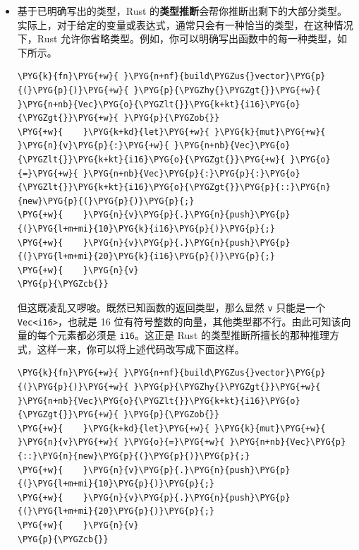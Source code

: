\begin{itemize}
\item 基于已明确写出的类型，Rust 的\textbf{类型推断}会帮你推断出剩下的大部分类型。实际上，对于给定的变量或表达式，通常只会有一种恰当的类型，在这种情况下，Rust 允许你省略类型。例如，你可以明确写出函数中的每一种类型，如下所示。

\begin{Verbatim}[commandchars=\\\{\},breaklines=true,breakanywhere=true,fontsize=\codefont,xleftmargin=17bp]
\PYG{k}{fn}\PYG{+w}{ }\PYG{n+nf}{build\PYGZus{}vector}\PYG{p}{(}\PYG{p}{)}\PYG{+w}{ }\PYG{p}{\PYGZhy{}\PYGZgt{}}\PYG{+w}{ }\PYG{n+nb}{Vec}\PYG{o}{\PYGZlt{}}\PYG{k+kt}{i16}\PYG{o}{\PYGZgt{}}\PYG{+w}{ }\PYG{p}{\PYGZob{}}
\PYG{+w}{    }\PYG{k+kd}{let}\PYG{+w}{ }\PYG{k}{mut}\PYG{+w}{ }\PYG{n}{v}\PYG{p}{:}\PYG{+w}{ }\PYG{n+nb}{Vec}\PYG{o}{\PYGZlt{}}\PYG{k+kt}{i16}\PYG{o}{\PYGZgt{}}\PYG{+w}{ }\PYG{o}{=}\PYG{+w}{ }\PYG{n+nb}{Vec}\PYG{p}{:}\PYG{p}{:}\PYG{o}{\PYGZlt{}}\PYG{k+kt}{i16}\PYG{o}{\PYGZgt{}}\PYG{p}{::}\PYG{n}{new}\PYG{p}{(}\PYG{p}{)}\PYG{p}{;}
\PYG{+w}{    }\PYG{n}{v}\PYG{p}{.}\PYG{n}{push}\PYG{p}{(}\PYG{l+m+mi}{10}\PYG{k}{i16}\PYG{p}{)}\PYG{p}{;}
\PYG{+w}{    }\PYG{n}{v}\PYG{p}{.}\PYG{n}{push}\PYG{p}{(}\PYG{l+m+mi}{20}\PYG{k}{i16}\PYG{p}{)}\PYG{p}{;}
\PYG{+w}{    }\PYG{n}{v}
\PYG{p}{\PYGZcb{}}
\end{Verbatim}

但这既凌乱又啰唆。既然已知函数的返回类型，那么显然 \texttt{v} 只能是一个 \texttt{Vec<i16>}，也就是 16 位有符号整数的向量，其他类型都不行。由此可知该向量的每个元素都必须是 \texttt{i16}。这正是 Rust 的类型推断所擅长的那种推理方式，这样一来，你可以将上述代码改写成下面这样。

\begin{Verbatim}[commandchars=\\\{\},breaklines=true,breakanywhere=true,fontsize=\codefont,xleftmargin=17bp]
\PYG{k}{fn}\PYG{+w}{ }\PYG{n+nf}{build\PYGZus{}vector}\PYG{p}{(}\PYG{p}{)}\PYG{+w}{ }\PYG{p}{\PYGZhy{}\PYGZgt{}}\PYG{+w}{ }\PYG{n+nb}{Vec}\PYG{o}{\PYGZlt{}}\PYG{k+kt}{i16}\PYG{o}{\PYGZgt{}}\PYG{+w}{ }\PYG{p}{\PYGZob{}}
\PYG{+w}{    }\PYG{k+kd}{let}\PYG{+w}{ }\PYG{k}{mut}\PYG{+w}{ }\PYG{n}{v}\PYG{+w}{ }\PYG{o}{=}\PYG{+w}{ }\PYG{n+nb}{Vec}\PYG{p}{::}\PYG{n}{new}\PYG{p}{(}\PYG{p}{)}\PYG{p}{;}
\PYG{+w}{    }\PYG{n}{v}\PYG{p}{.}\PYG{n}{push}\PYG{p}{(}\PYG{l+m+mi}{10}\PYG{p}{)}\PYG{p}{;}
\PYG{+w}{    }\PYG{n}{v}\PYG{p}{.}\PYG{n}{push}\PYG{p}{(}\PYG{l+m+mi}{20}\PYG{p}{)}\PYG{p}{;}
\PYG{+w}{    }\PYG{n}{v}
\PYG{p}{\PYGZcb{}}
\end{Verbatim}


\end{itemize}
